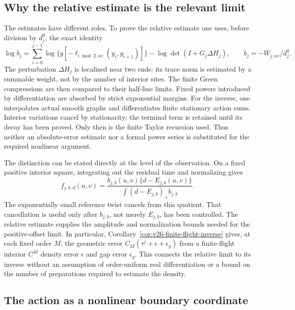 \subsection{Why the relative estimate is the relevant limit}

The estimates have different roles.  To prove the relative estimate one
uses, before division by $d_j^0$, the exact identity
\begin{equation}\label{eq:v56-normalized-determinant}
 \log b_j=\sum_{i=0}^{j-1}
 \log\{g[-\ell_{i\bmod2,uv}(y_i,y_{i+1})]\}
                         -\log\det(I+G_j\Delta H_j),
 \qquad b_j=-W_{j,uv}/d_j^0.
\end{equation}
The perturbation $\Delta H_j$ is localized near two ends; its trace norm
is estimated by a summable weight, not by the number of interior sites.
The finite Green compressions are then compared to their half-line
limits.  Fixed powers introduced by differentiation are absorbed by
strict exponential margins.  For the inverse, one interpolates actual
smooth graphs and differentiates finite stationary action sums.  Interior
variations cancel by stationarity; the terminal term is retained until
its decay has been proved.  Only then is the finite Taylor recursion
used.  Thus neither an absolute-error estimate nor a formal power series
is substituted for the required nonlinear argument.

The distinction can be stated directly at the level of the observation.
On a fixed positive interior square, integrating out the residual time
and normalizing gives
\[
 f_{j,b,d}(u,v)=
 \frac{b_{j,b}(u,v)\{d-E_{j,b}(u,v)\}}
 {\int (d-E_{j,b})_+b_{j,b}}.
\]
The exponentially small reference twist cancels from this quotient.
That cancellation is useful only after $b_{j,b}$, not merely $E_{j,b}$,
has been controlled.  The relative estimate supplies the amplitude and
normalization bounds needed for the positive-offset limit.  In particular,
Corollary~\ref{cor:v26-finite-flight-inverse} gives, at each fixed order
$M$, the geometric error $C_M(\tau^j+\epsilon+\epsilon_g)$ from a
finite-flight interior $C^M$ density error $\epsilon$ and gap error
$\epsilon_g$.  This connects the relative limit to its inverse without
an assumption of order-uniform real differentiation or a bound on the
number of preparations required to estimate the density.

\subsection{The action as a nonlinear boundary coordinate}

